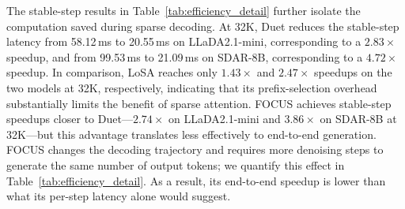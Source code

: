 The stable-step results in Table~\ref{tab:efficiency_detail} further isolate the computation saved during sparse decoding. At 32K, Duet reduces the stable-step latency from 58.12\,ms to 20.55\,ms on LLaDA2.1-mini, corresponding to a $2.83\times$ speedup, and from 99.53\,ms to 21.09\,ms on SDAR-8B, corresponding to a $4.72\times$ speedup. In comparison, LoSA reaches only $1.43\times$ and $2.47\times$ speedups on the two models at 32K, respectively, indicating that its prefix-selection overhead substantially limits the benefit of sparse attention. FOCUS achieves stable-step speedups closer to Duet---$2.74\times$ on LLaDA2.1-mini and $3.86\times$ on SDAR-8B at 32K---but this advantage translates less effectively to end-to-end generation. FOCUS changes the decoding trajectory and requires more denoising steps to generate the same number of output tokens; we quantify this effect in Table~\ref{tab:efficiency_detail}. As a result, its end-to-end speedup is lower than what its per-step latency alone would suggest.




